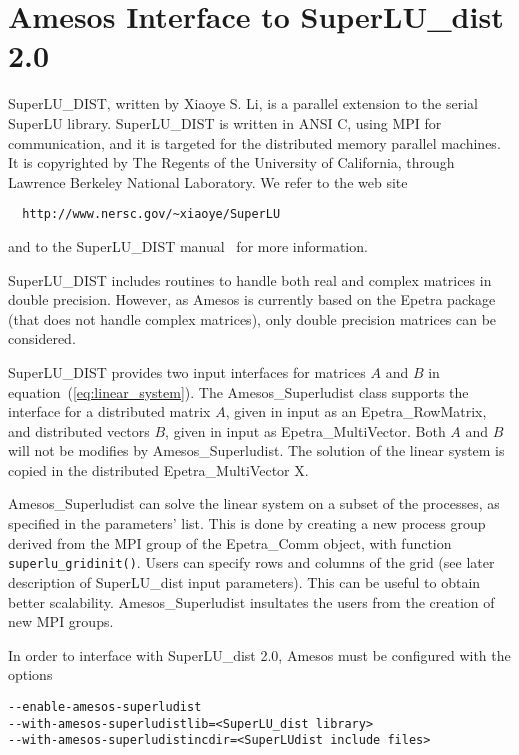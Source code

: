 \documentclass[11pt,letter]{article}
\begin{document}

\section{Amesos Interface to SuperLU\_dist 2.0}
\label{sec:superludist}

SuperLU\_DIST, written by Xiaoye S. Li, is a parallel extension to the
serial SuperLU library.  SuperLU\_DIST is written in ANSI C, using MPI
for communication, and it is targeted for the distributed memory
parallel machines. It is copyrighted by The Regents of the University of
California, through Lawrence Berkeley National Laboratory.  We refer to
the web site
\begin{verbatim}
  http://www.nersc.gov/~xiaoye/SuperLU
\end{verbatim}
and to the SuperLU\_DIST manual~\cite{superlu-manual} for more
information.

SuperLU\_DIST includes routines to handle both real and complex matrices
in double precision. However, as Amesos is currently based on the Epetra
package (that does not handle complex matrices), only double precision
matrices can be considered.

SuperLU\_DIST provides two input interfaces for matrices $A$ and $B$ in
equation~(\ref{eq:linear_system}). The Amesos\_Superludist class
supports the interface for a distributed matrix $A$, given in input as
an Epetra\_RowMatrix, and distributed vectors $B$, given in input as
Epetra\_MultiVector. Both $A$ and $B$ will not be modifies by
Amesos\_Superludist. The solution of the linear system is copied in the
distributed Epetra\_MultiVector X.

Amesos\_Superludist can solve the linear system on a subset of the
processes, as specified in the parameters' list. This is done by
creating a new process group derived from the MPI group of the
Epetra\_Comm object, with function \verb!superlu_gridinit()!. Users can
specify rows and columns of the grid (see later description of
SuperLU\_dist input parameters). This can be useful to obtain better
scalability. Amesos\_Superludist insultates the users from the creation
of new MPI groups.

\medskip

In order to interface with SuperLU\_dist 2.0, Amesos must be configured with
the options
\begin{verbatim}
--enable-amesos-superludist 
--with-amesos-superludistlib=<SuperLU_dist library>
--with-amesos-superludistincdir=<SuperLUdist include files>
\end{verbatim}
\end{document}

